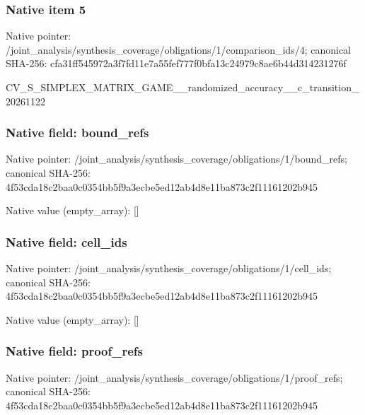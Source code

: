 \documentclass[10pt,a4paper]{article}
\begin{document}
\subsubsection{Native item 5}


Native pointer: /joint\_analysis/synthesi\allowbreak{}s\_coverage/obligations/1\allowbreak{}/comparison\_ids/4; canonical SHA-256: cfa31ff545972a3f7fd11e7a\allowbreak{}55fef777f0bfa13c24979c8a\allowbreak{}e6b44d314231276f


CV\_S\_SIMPLEX\_MATRIX\_GAME\allowbreak{}\_\_randomized\_accuracy\_\_c\allowbreak{}\_transition\_20261122


\subsubsection{Native field: bound\_refs}


Native pointer: /joint\_analysis/synthesi\allowbreak{}s\_coverage/obligations/1\allowbreak{}/bound\_refs; canonical SHA-256: 4f53cda18c2baa0c0354bb5f\allowbreak{}9a3ecbe5ed12ab4d8e11ba87\allowbreak{}3c2f11161202b945



Native value (empty\_array): []



\subsubsection{Native field: cell\_ids}


Native pointer: /joint\_analysis/synthesi\allowbreak{}s\_coverage/obligations/1\allowbreak{}/cell\_ids; canonical SHA-256: 4f53cda18c2baa0c0354bb5f\allowbreak{}9a3ecbe5ed12ab4d8e11ba87\allowbreak{}3c2f11161202b945



Native value (empty\_array): []



\subsubsection{Native field: proof\_refs}


Native pointer: /joint\_analysis/synthesi\allowbreak{}s\_coverage/obligations/1\allowbreak{}/proof\_refs; canonical SHA-256: 4f53cda18c2baa0c0354bb5f\allowbreak{}9a3ecbe5ed12ab4d8e11ba87\allowbreak{}3c2f11161202b945
\end{document}
